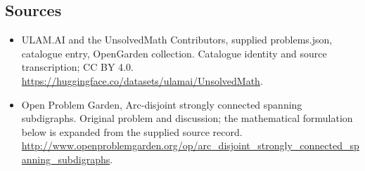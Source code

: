 \documentclass[11pt,a4paper]{article}
\begin{document}
\subsection{Sources}
\begin{itemize}
\item[S1] ULAM.AI and the UnsolvedMath Contributors, supplied problems.json, catalogue entry, OpenGarden collection. Catalogue identity and source transcription; CC BY 4.0.
\url{https://huggingface.co/datasets/ulamai/UnsolvedMath}.
\item[S2] Open Problem Garden, Arc-disjoint strongly connected spanning subdigraphs. Original problem and discussion; the mathematical formulation below is expanded from the supplied source record.
\url{http://www.openproblemgarden.org/op/arc_disjoint_strongly_connected_spanning_subdigraphs}.

\end{itemize}
\end{document}
